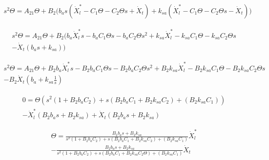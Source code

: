 \documentclass{article}
\begin{document}
            \begin{equation}
                \begin{split}
                s^2 \Theta = A_{21} \Theta + B_{2} \biggl(  b_a s\left(\dot{X}_l^*- C_1 \Theta -C_2 \Theta s + \dot{X}_t\right) + k_{sa}\left(\dot{X}_l^* -C_1 \Theta -C_2 \Theta s - \dot{X}_t\right)\biggr)
                \end{split}
            \end{equation}

            \begin{equation}
                \begin{split}
                s^2 \Theta = A_{21} \Theta + B_{2}\biggl(  b_a \dot{X}_l^* s- b_a C_1 \Theta s-b_a  C_2 \Theta s^2 + k_{sa}\dot{X}_l^* - k_{sa} C_1 \Theta - k_{sa} C_2 \Theta s\\
                - \dot{X}_t\left(b_a s+k_{sa}\right)\biggr)
                \end{split}
            \end{equation}

            \begin{equation}
                \begin{split}
                s^2 \Theta = A_{21} \Theta + B_{2}b_a\dot{X}_l^* s - B_{2}b_a C_1 \Theta s-B_{2}b_a C_2 \Theta s^2 + B_{2}k_{sa}\dot{X}_l^* - B_{2}k_{sa} C_1 \Theta  - B_{2}k_{sa} C_2 \Theta s\\
                - B_{2}\dot{X}_t\left(b_a+k_{sa}\frac{1}{s}\right)
                \end{split}
            \end{equation}

            \begin{equation}
                \begin{split}
                0= \Theta \left( s^2 \left(1+B_{2}b_a C_2\right) + s \left( B_{2}b_a C_1 +B_{2}k_{sa} C_2 \right) + \left( B_{2}k_{sa} C_1 \right) \right)\\
                - \dot{X}_l^*\left(B_{2}b_a s + B_{2}k_{sa}\right) +\dot{X}_t\left(B_{2}b_a s+B_{2}k_{sa}\right)
                \end{split}
            \end{equation}


            \begin{equation}
                \begin{split}
                    \Theta= \frac{B_{2}b_a s + B_{2}k_{sa}}{ s^2 \left(1+B_{2}b_a C_2\right) + s \left( B_{2}b_a C_1 +B_{2}k_{sa} C_2 \right) + \left( B_{2}k_{sa} C_1 \right)} \dot{X}_l^*\\
                    - \frac{B_{2}b_a s+B_{2}k_{sa}}{ s^2 \left(1+B_{2}b_a C_2\right) + s \left( B_{2}b_a C_1 +B_{2}k_{sa} C_2 \Theta \right) + \left( B_{2}k_{sa} C_1 \right)} \dot{X}_t
                \end{split}
            \end{equation}
\end{document}
